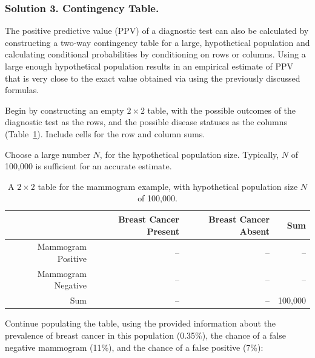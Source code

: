 \subsubsection{Solution 3. Contingency Table.}

The positive predictive value (PPV) of a diagnostic test can also be calculated by constructing a two-way contingency table for a large, hypothetical population and calculating conditional probabilities by conditioning on rows or columns. Using a large enough hypothetical population results in an empirical estimate of PPV that is very close to the exact value obtained via using the previously discussed formulas.

Begin by constructing an empty $2 \times 2$ table, with the possible outcomes of the diagnostic test as the rows, and the possible disease statuses as the columns (Table~\ref{tableMammogramSetup}). Include cells for the row and column sums.

Choose a large number $N$, for the hypothetical population size. Typically, $N$ of 100,000 is sufficient for an accurate estimate. 

\begin{table}[ht]
	\centering
	\begin{tabular}{rrrr}
		\hline
		& Breast Cancer Present & Breast Cancer Absent & Sum \\ 
		\hline
		Mammogram Positive & -- & -- & -- \\ 
		Mammogram Negative & -- & -- & -- \\ 
		Sum & -- & -- & 100,000 \\ 
		\hline
	\end{tabular}
	\caption{A $2 \times 2$ table for the mammogram example, with hypothetical population size $N$ of 100,000.}
	\label{tableMammogramSetup}
\end{table}

Continue populating the table, using the provided information about the prevalence of breast cancer in this population (0.35\%), the chance of a false negative mammogram (11\%), and the chance of a false positive (7\%):

